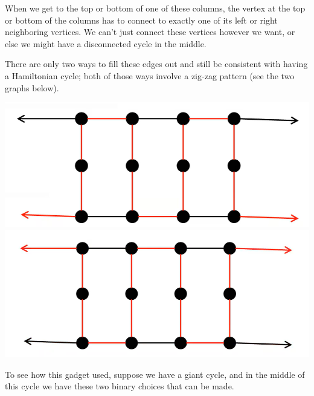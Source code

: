 \documentclass[letterpaper]{article}
\begin{document}
\begin{itemize}
    When we get to the top or bottom of one of these columns, the vertex at the top or bottom of the columns has to connect to exactly one of its left or right neighboring vertices. We can't just connect these vertices however we want, or else we might have a disconnected cycle in the middle. 

    \bigskip 

    There are only two ways to fill these edges out and still be consistent with having a Hamiltonian cycle; both of those ways involve a zig-zag pattern (see the two graphs below). 
    \begin{center}
        \includegraphics[scale=0.3]{assets/zoe_ham_5.png}
        \includegraphics[scale=0.3]{assets/zoe_ham_6.png}
    \end{center}
    To see how this gadget used, suppose we have a giant cycle, and in the middle of this cycle we have these two binary choices that can be made. 
    \begin{center}

\end{center}
\end{itemize}
\end{document}
